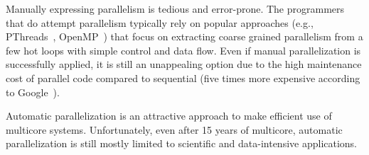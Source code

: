 Manually expressing parallelism is tedious and error-prone. The programmers that
do attempt parallelism typically rely on popular approaches (e.g.,
PThreads~\cite{pthread:web}, OpenMP~\cite{openmp:web}) that focus on extracting
coarse grained parallelism from a few hot loops with simple control and data
flow. Even if manual parallelization is successfully applied,
it is still an unappealing option due to the high maintenance cost of parallel
code compared to sequential (five times more expensive according to
Google~\cite{google_cite_simone}).
%
%
%
%
%

Automatic parallelization is an attractive approach to make efficient use of
multicore systems.
Unfortunately, even after 15 years of multicore, automatic parallelization is
still mostly limited to scientific and data-intensive applications.


